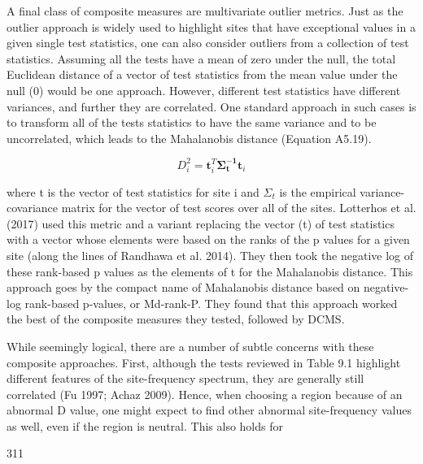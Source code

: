 \documentclass{article}
\begin{document}
A final class of composite measures are multivariate outlier metrics. Just as the outlier approach is widely used to highlight sites that have exceptional values in a given single test statistics, one can also consider outliers from a collection of test statistics. Assuming all the tests have a mean of zero under the null, the total Euclidean distance of a vector of test statistics from the mean value under the null (0) would be one approach. However, different test statistics have different variances, and further they are correlated. One standard approach in such cases is to transform all of the tests statistics to have the same variance and to be uncorrelated, which leads to the Mahalanobis distance (Equation A5.19).

\begin{equation}
D_{i}^{2}=\mathbf{t}_{i}^{T}\mathbf{\Sigma _{t}^{-1}}\mathbf{t}_{i}
\tag{9.29b}
\label{eq:9_29b}
\end{equation}

where t is the vector of test statistics for site i and  $ \Sigma_t $ is the empirical variance-covariance matrix for the vector of test scores over all of the sites. Lotterhos et al. (2017) used this metric and a variant replacing the vector (t) of test statistics with a vector whose elements were based on the ranks of the p values for a given site (along the lines of Randhawa et al. 2014). They then took the negative log of these rank-based p values as the elements of t for the Mahalanobis distance. This approach goes by the compact name of Mahalanobis distance based on negative-log rank-based p-values, or Md-rank-P. They found that this approach worked the best of the composite measures they tested, followed by DCMS.

While seemingly logical, there are a number of subtle concerns with these composite approaches. First, although the tests reviewed in Table 9.1 highlight different features of the site-frequency spectrum, they are generally still correlated (Fu 1997; Achaz 2009). Hence, when choosing a region because of an abnormal D value, one might expect to find other abnormal site-frequency values as well, even if the region is neutral. This also holds for

311
\end{document}
